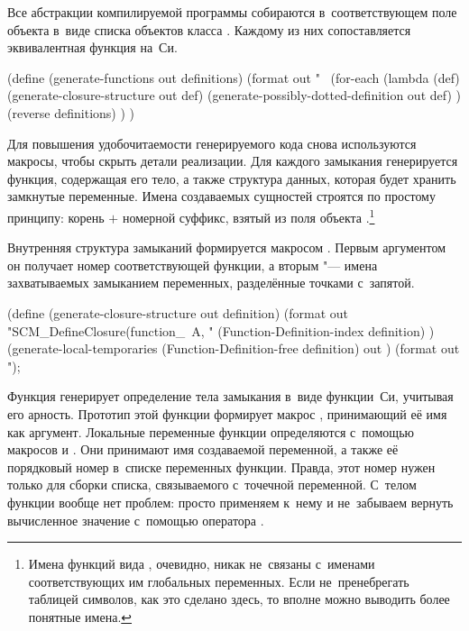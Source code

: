 Все абстракции компилируемой программы собираются в~соответствующем
поле объекта  в~виде списка объектов класса
. Каждому из них сопоставляется
эквивалентная функция на~Си.

\begin{code:lisp}
(define (generate-functions out definitions)
  (format out "~%
  (for-each (lambda (def)
              (generate-closure-structure out def)
              (generate-possibly-dotted-definition out def) )
            (reverse definitions) ) )
\end{code:lisp}

Для повышения удобочитаемости генерируемого кода снова используются макросы,
чтобы скрыть детали реализации. Для каждого замыкания генерируется функция,
содержащая его тело, а также структура данных, которая будет хранить
замкнутые переменные. Имена создаваемых сущностей строятся по простому
принципу: корень  $+$ номерной суффикс, взятый из поля
 объекта .\footnote*{Имена функций вида
, очевидно, никак не~связаны с~именами соответствующих им
глобальных переменных. Если не~пренебрегать таблицей символов, как это сделано
здесь, то вполне можно выводить более понятные имена.}

Внутренняя структура замыканий формируется макросом .
Первым аргументом он получает номер соответствующей функции, а вторым "--- имена
захватываемых замыканием переменных, разделённые точками с~запятой.

\begin{code:lisp}
(define (generate-closure-structure out definition)
  (format out "SCM_DefineClosure(function_~A, "
          (Function-Definition-index definition) )
  (generate-local-temporaries (Function-Definition-free definition)
                              out )
  (format out ");~%
\end{code:lisp}

Функция  генерирует определение тела
замыкания в~виде функции~Си, учитывая его арность. Прототип этой функции
формирует макрос , принимающий её имя как аргумент.
Локальные переменные функции определяются с~помощью макросов
 и . Они
принимают имя создаваемой переменной, а также её порядковый номер в~списке
переменных функции. Правда, этот номер нужен только для сборки списка,
связываемого с~точечной переменной. С~телом функции вообще нет проблем: просто
применяем к~нему  и не~забываем вернуть вычисленное значение с~помощью
оператора .

